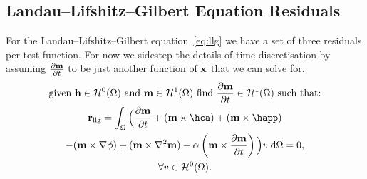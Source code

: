 


\subsection{Landau--Lifshitz--Gilbert Equation Residuals}

For the Landau--Lifshitz--Gilbert equation~\eqref{eq:llg} we have a set of three residuals per test function. For now we sidestep the details of time discretisation by assuming $\frac{\partial \mathbf{m}}{\partial t}$ to be just another function of $\mathbf{x}$ that we can solve for.
\begin{gather}
  \text{given $\hv \in \sob^0(\magd)$ and $\mv \in \sob^1(\magd)$ find $\dmdt \in \sob^1(\magd)$ such that:} \notag
  \\
  \mathbf{r}_{\text{llg}} = \int_\magd \Big( \dmdt
  + (\mv \times \hca) + (\mv \times \happ) \\
  - (\mv \times \nabla \phi) + (\mv \times \lap \mv)
  - \dampc \left( \mv \times \dmdt \right)
  \Big)  v \d\magd
  = 0, \label{res:contllg}
  \\
  \forall v \in \sob^0(\magd). \notag
\end{gather}

